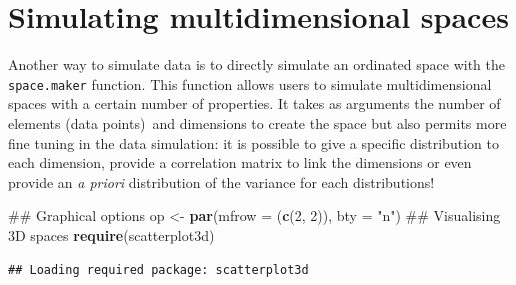 \documentclass[]{book}
\newenvironment{Shaded}{\begin{snugshade}}{\end{snugshade}}
\newcommand{\KeywordTok}[1]{\textcolor[rgb]{0.13,0.29,0.53}{\textbf{#1}}}
\newcommand{\DataTypeTok}[1]{\textcolor[rgb]{0.13,0.29,0.53}{#1}}
\newcommand{\DecValTok}[1]{\textcolor[rgb]{0.00,0.00,0.81}{#1}}
\newcommand{\StringTok}[1]{\textcolor[rgb]{0.31,0.60,0.02}{#1}}
\newcommand{\NormalTok}[1]{#1}
\theoremstyle{definition}
\theoremstyle{definition}
\theoremstyle{remark}
\begin{document}
\section{Simulating multidimensional
spaces}\label{simulating-multidimensional-spaces}

Another way to simulate data is to directly simulate an ordinated space
with the \texttt{space.maker} function. This function allows users to
simulate multidimensional spaces with a certain number of properties. It
takes as arguments the number of elements (data points)~and dimensions
to create the space but also permits more fine tuning in the data
simulation: it is possible to give a specific distribution to each
dimension, provide a correlation matrix to link the dimensions or even
provide an \emph{a priori} distribution of the variance for each
distributions!

\begin{Shaded}
\begin{Highlighting}[]
\NormalTok{## Graphical options}
\NormalTok{op <-}\StringTok{ }\KeywordTok{par}\NormalTok{(}\DataTypeTok{mfrow =}\NormalTok{ (}\KeywordTok{c}\NormalTok{(}\DecValTok{2}\NormalTok{, }\DecValTok{2}\NormalTok{)), }\DataTypeTok{bty =} \StringTok{"n"}\NormalTok{)}
\NormalTok{## Visualising 3D spaces}
\KeywordTok{require}\NormalTok{(scatterplot3d)}
\end{Highlighting}
\end{Shaded}

\begin{verbatim}
## Loading required package: scatterplot3d
\end{verbatim}
\end{document}
